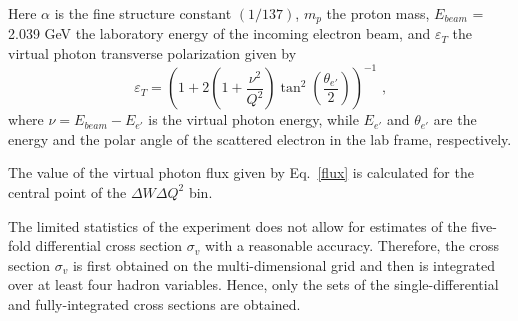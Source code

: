 Here $\alpha$ is the fine structure constant $\left(1/137\right)$, $m_{p}$ the proton mass, $E_{beam}$ = 2.039 GeV the laboratory energy of the incoming electron beam, and $\varepsilon_{T}$ the virtual photon transverse polarization given by \vspace{-1em}
\begin{equation}
\varepsilon_{T} = \left( 1 + 2\left( 1 +
\frac{\nu^{2}}{Q^{2}} \right)
\tan^{2}\left(\frac{\theta_{e'}}{2}\right) \right)^{-1} \textrm{ ,}
\label{polarization}
\end{equation}
where $\nu = E_{beam} - E_{e'}$ is the virtual photon energy, while $E_{e'}$ and $\theta_{e'}$ are the energy and the polar angle of the scattered electron in the lab frame, respectively. 

The value of the virtual photon flux given by Eq.~\eqref{flux} is calculated for the central point of the $\Delta W \Delta Q^{2}$ bin. %

The limited statistics of the experiment does not allow for estimates of the five-fold differential cross section $\sigma_{v}$ with a reasonable accuracy. Therefore, the cross section $\sigma_{v}$ is first obtained on the multi-dimensional grid and then is integrated over at least four hadron variables. Hence, only the sets of the single-differential and fully-integrated cross sections are obtained.



